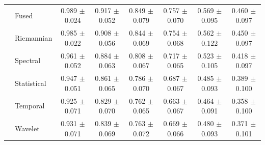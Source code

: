 \begin{table}[t]
\begin{tabular}{llcccccc}
 & Fused & 0.989 $\pm$ 0.024 & 0.917 $\pm$ 0.052 & 0.849 $\pm$ 0.079 & 0.757 $\pm$ 0.070 & 0.569 $\pm$ 0.095 & 0.460 $\pm$ 0.097 \\
 & Riemannian & 0.985 $\pm$ 0.022 & 0.908 $\pm$ 0.056 & 0.844 $\pm$ 0.069 & 0.754 $\pm$ 0.068 & 0.562 $\pm$ 0.122 & 0.450 $\pm$ 0.097 \\
 & Spectral & 0.961 $\pm$ 0.052 & 0.884 $\pm$ 0.063 & 0.808 $\pm$ 0.067 & 0.717 $\pm$ 0.065 & 0.523 $\pm$ 0.105 & 0.418 $\pm$ 0.097 \\
 & Statistical & 0.947 $\pm$ 0.051 & 0.861 $\pm$ 0.065 & 0.786 $\pm$ 0.070 & 0.687 $\pm$ 0.067 & 0.485 $\pm$ 0.093 & 0.389 $\pm$ 0.100 \\
 & Temporal & 0.925 $\pm$ 0.071 & 0.829 $\pm$ 0.070 & 0.762 $\pm$ 0.065 & 0.663 $\pm$ 0.067 & 0.464 $\pm$ 0.091 & 0.358 $\pm$ 0.100 \\
 & Wavelet & 0.931 $\pm$ 0.071 & 0.839 $\pm$ 0.069 & 0.763 $\pm$ 0.072 & 0.669 $\pm$ 0.066 & 0.480 $\pm$ 0.093 & 0.371 $\pm$ 0.101 \\
\bottomrule
\end{tabular}
\end{table}